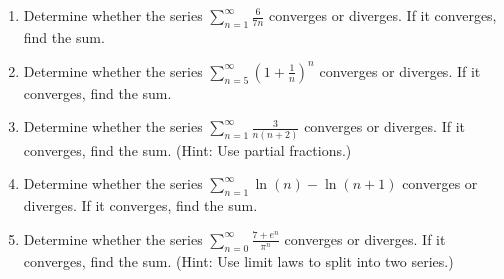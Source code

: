 \documentclass[12pt]{article}
\begin{document}
\begin{enumerate}
\[1-\frac{1}{\sqrt{3}}+\frac{1}{3}-\frac{1}{3\sqrt{3}}+\frac{1}{9}-\frac{1}{9\sqrt{3}}+\cdots\]
\vfill
\item Determine whether the series $\displaystyle \sum_{n = 1}^\infty \frac{6}{7n}$ converges or diverges.  If it converges, find the sum.
\vfill

\item Determine whether the series $\displaystyle \sum_{n = 5}^\infty \left(1 + \frac{1}{n}\right)^n$ converges or diverges.  If it converges, find the sum.
\vfill
\newpage

\item Determine whether the series $\displaystyle\sum_{n=1}^{\infty}\displaystyle\frac{3}{n(n+2)}$ converges or diverges. If it converges, find the sum. (Hint: Use partial fractions.)

\vfill

\item Determine whether the series $\displaystyle\sum_{n=1}^{\infty}\ln(n) - \ln(n + 1)$ converges or diverges. If it converges, find the sum.

\vfill

\item Determine whether the series $\displaystyle\sum_{n=0}^{\infty}\frac{7 + e^n}{\pi^n}$ converges or diverges. If it converges, find the sum. (Hint: Use limit laws to split into two series.)


\end{enumerate}
\end{document}
